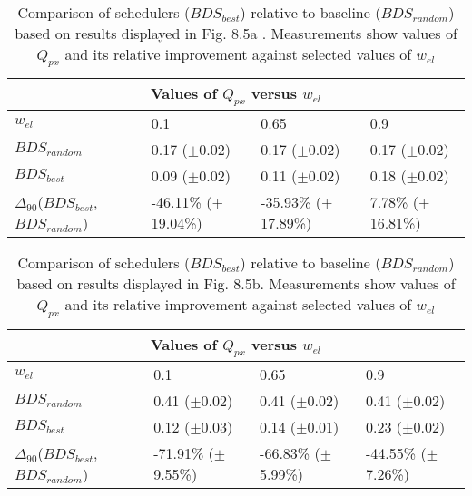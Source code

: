 \clearpage
\begin{landscape}
\begin{table}[h]
\begin{center}
\begin{tabular}{llll}
\toprule
\multicolumn{4}{c}{Values of $Q_{px}$ versus $w_{el}$}\\
\midrule
$w_{el}$ & 0.1 & 0.65 & 0.9\\
\midrule
$BDS_{random}$ &  0.17 ($\pm$0.02) &  0.17 ($\pm$0.02) &  0.17 ($\pm$0.02)\\
\midrule
$BDS_{best}$ &  0.09 ($\pm$0.02) &  0.11 ($\pm$0.02) &  0.18 ($\pm$0.02)\\
$\Delta_{90}$($BDS_{best}$,$BDS_{random}$) & -46.11\% ($\pm$19.04\%) & -35.93\% ($\pm$17.89\%) & 7.78\% ($\pm$16.81\%)\\
\bottomrule
\end{tabular}
\end{center}
\caption[Comparison of $Q_{px}$ versus $w_{el}$ for $BDS_{best}$ relative to $BDS_{random}$.]{Comparison of schedulers ($BDS_{best}$) relative to baseline ($BDS_{random}$) based on results displayed in Fig. 8.5a . Measurements show values of $Q_{px}$ and its relative improvement against selected values of $w_{el}$}
\label{b:f85a}
\end{table}
\end{landscape}


\clearpage
\begin{landscape}
\begin{table}[h]
\begin{center}
\begin{tabular}{llll}
\toprule
\multicolumn{4}{c}{Values of $Q_{px}$ versus $w_{el}$}\\
\midrule
$w_{el}$ & 0.1 & 0.65 & 0.9\\
\midrule
$BDS_{random}$ &  0.41 ($\pm$0.02) &  0.41 ($\pm$0.02) &  0.41 ($\pm$0.02)\\
\midrule
$BDS_{best}$ &  0.12 ($\pm$0.03) &  0.14 ($\pm$0.01) &  0.23 ($\pm$0.02)\\
$\Delta_{90}$($BDS_{best}$,$BDS_{random}$) & -71.91\% ($\pm$9.55\%) & -66.83\% ($\pm$5.99\%) & -44.55\% ($\pm$7.26\%)\\
\bottomrule
\end{tabular}
\end{center}
\caption[Comparison of $Q_{px}$ versus $w_{el}$ for $BDS_{best}$ relative to $BDS_{random}$.]{Comparison of schedulers ($BDS_{best}$) relative to baseline ($BDS_{random}$) based on results displayed in Fig. 8.5b. Measurements show values of $Q_{px}$ and its relative improvement against selected values of $w_{el}$}
\label{b:f85b}
\end{table}
\end{landscape}


